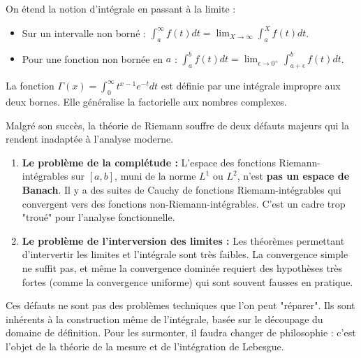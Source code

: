 \begin{definition}
    On étend la notion d'intégrale en passant à la limite :
    \begin{itemize}
        \item Sur un intervalle non borné : $\int_a^\infty f(t) dt = \lim_{X \to \infty} \int_a^X f(t) dt$.
        \item Pour une fonction non bornée en $a$ : $\int_a^b f(t) dt = \lim_{\epsilon \to 0^+} \int_{a+\epsilon}^b f(t) dt$.
    \end{itemize}
\end{definition}

\begin{example}
    La fonction $\Gamma(x) = \int_0^\infty t^{x-1}e^{-t}dt$ est définie par une intégrale impropre aux deux bornes. Elle généralise la factorielle aux nombres complexes.
\end{example}

\begin{remark}
    Malgré son succès, la théorie de Riemann souffre de deux défauts majeurs qui la rendent inadaptée à l'analyse moderne.
    \begin{enumerate}
        \item \textbf{Le problème de la complétude :} L'espace des fonctions Riemann-intégrables sur $[a,b]$, muni de la norme $L^1$ ou $L^2$, n'est \textbf{pas un espace de Banach}. Il y a des suites de Cauchy de fonctions Riemann-intégrables qui convergent vers des fonctions non-Riemann-intégrables. C'est un cadre trop "troué" pour l'analyse fonctionnelle.
        \item \textbf{Le problème de l'interversion des limites :} Les théorèmes permettant d'intervertir les limites et l'intégrale sont très faibles. La convergence simple ne suffit pas, et même la convergence dominée requiert des hypothèses très fortes (comme la convergence uniforme) qui sont souvent fausses en pratique.
    \end{enumerate}
    Ces défauts ne sont pas des problèmes techniques que l'on peut "réparer". Ils sont inhérents à la construction même de l'intégrale, basée sur le découpage du domaine de définition. Pour les surmonter, il faudra changer de philosophie : c'est l'objet de la théorie de la mesure et de l'intégration de Lebesgue.
\end{remark}
